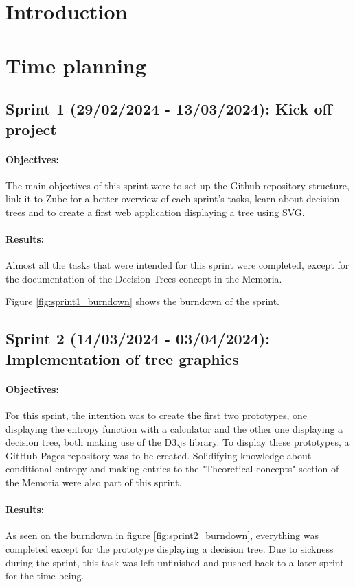 
\section{Introduction}

\section{Time planning}
\subsection{Sprint 1 (29/02/2024 - 13/03/2024): Kick off project}
\paragraph{Objectives:}
The main objectives of this sprint were to set up the Github repository structure, link it to Zube for a better overview of each sprint's tasks, learn about decision trees and to create a first web application displaying a tree using SVG.

\paragraph{Results:}
Almost all the tasks that were intended for this sprint were completed, except for the documentation of the Decision Trees concept in the Memoria.

Figure \ref{fig:sprint1_burndown} shows the burndown of the sprint.

\subsection{Sprint 2 (14/03/2024 - 03/04/2024): Implementation of tree graphics}
\paragraph{Objectives:}
For this sprint, the intention was to create the first two prototypes, one displaying the entropy function with a calculator and the other one displaying a decision tree, both making use of the D3.js library. To display these prototypes, a GitHub Pages repository was to be created. Solidifying knowledge about conditional entropy and making entries to the "Theoretical concepts" section of the Memoria were also part of this sprint. 

\paragraph{Results:}
As seen on the burndown in figure \ref{fig:sprint2_burndown}, everything was completed except for the prototype displaying a decision tree. Due to sickness during the sprint, this task was left unfinished and pushed back to a later sprint for the time being.

